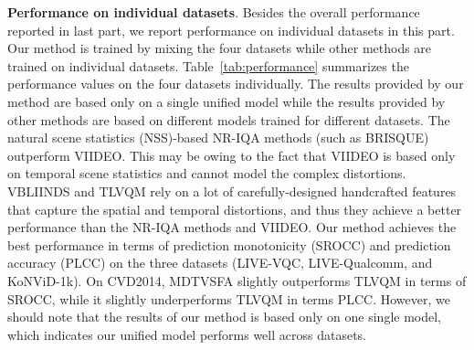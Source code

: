 \documentclass[twocolumn]{svjour3}          \smartqed  \usepackage{graphicx}
\begin{document}
\textbf{Performance on individual datasets}. 
Besides the overall performance reported in last part, we report performance on individual datasets in this part.
Our method is trained by mixing the four datasets while other methods are trained on individual datasets. 
Table~\ref{tab:performance} summarizes the performance values on the four datasets individually. 
The results provided by our method are based only on a single unified model while the results provided by other methods are based on different models trained for different datasets.
The natural scene statistics (NSS)-based NR-IQA methods (such as BRISQUE) outperform VIIDEO.
This may be owing to the fact that VIIDEO is based only on temporal scene statistics and cannot model the complex distortions. 
VBLIINDS and TLVQM rely on a lot of carefully-designed handcrafted features that capture the spatial and temporal distortions, and thus they achieve a better performance than the NR-IQA methods and VIIDEO. 
Our method achieves the best performance in terms of prediction monotonicity (SROCC) and prediction accuracy (PLCC) on the three datasets (LIVE-VQC, LIVE-Qualcomm, and KoNViD-1k).
On CVD2014, MDTVSFA slightly outperforms TLVQM in terms of SROCC, while it slightly underperforms TLVQM in terms PLCC. 
However, we should note that the results of our method is based only on one single model, which indicates our unified model performs well across datasets.
\end{document}
